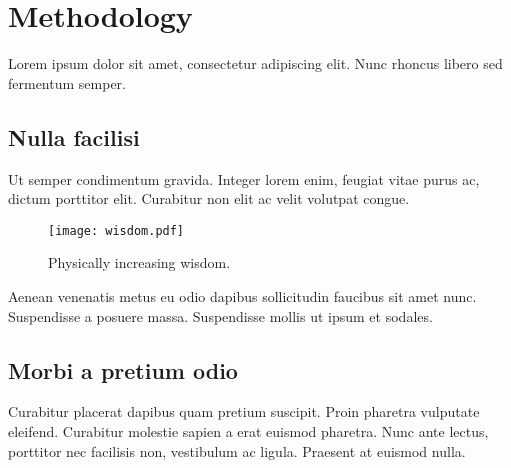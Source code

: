 \section{Methodology}
\label{sec:methodology}

Lorem ipsum dolor sit amet, consectetur adipiscing elit. Nunc rhoncus libero sed fermentum semper.

\subsection{Nulla facilisi}
Ut semper condimentum gravida. Integer lorem enim, feugiat vitae purus ac, dictum porttitor elit. Curabitur non elit ac velit volutpat congue.

\begin{figure}[h!]
\texttt{[image: wisdom.pdf]}
\caption{Physically increasing wisdom.}
\label{fig:wisdom}
\end{figure}

Aenean venenatis metus eu odio dapibus sollicitudin faucibus sit amet nunc. Suspendisse a posuere massa. Suspendisse mollis ut ipsum et sodales.

\subsection{Morbi a pretium odio}
Curabitur placerat dapibus quam pretium suscipit. Proin pharetra vulputate eleifend. Curabitur molestie sapien a erat euismod pharetra. Nunc ante lectus, porttitor nec facilisis non, vestibulum ac ligula. Praesent at euismod nulla.

